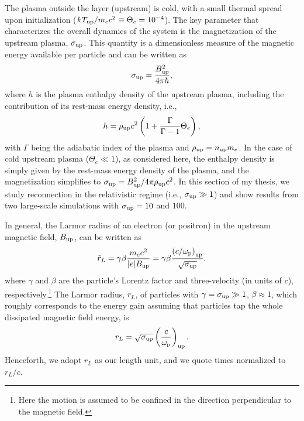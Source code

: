 The plasma outside the layer (upstream) is cold, with a small thermal spread upon initialization ($k T_{\rm up}/m_e c^2 \equiv \Theta_e =10^{-4}$). The key parameter that characterizes the overall dynamics of the system is the magnetization of the upstream plasma, $\sigma_{\rm up}$. This quantity is a dimensionless measure of the magnetic energy available per particle and can be written as
\begin{equation}
    \label{eq:sigmaups}
    \sigma_{\rm up} = \frac{B_{\rm up}^2}{4\pi h},
\end{equation}
where $h$ is the plasma enthalpy density of the upstream plasma, including the contribution of its rest-mass energy density, i.e., 
\begin{equation}
    \label{eq:enthalpy}
    h = \rho_{\rm up}c^2\left(1 + \frac{\Gamma}{\Gamma-1} \Theta_e\right),
\end{equation} 
with $\Gamma$ being the adiabatic index of the plasma and $\rho_{\rm up}=n_{\rm up} m_e$. In the case of cold upstream plasma ($\Theta_e \ll 1$), as considered here, the enthalpy density is simply given by the rest-mass energy  density of the plasma, and the magnetization simplifies to $\sigma_{\rm up} = B_{\rm up}^2/4\pi \rho_{\rm up} c^2$. In this section of my thesis, we study reconnection in the relativistic regime (i.e., $\sigma_{\rm up}\gg 1$) and show results from two large-scale simulations with $\sigma_{\rm up}=10$ and $100$.

In general, the Larmor radius of an electron (or positron) in the upstream magnetic field, $B_{\rm up}$, can be written as 
\begin{equation}
    \tilde{r}_{L} = \gamma\beta \frac{m_e c^2}{|e| B_{\rm up}} = 
    \gamma\beta\frac{\left(c/\omega_{\rm p}\right)_{\rm up}}{\sqrt{\sigma_{\rm up}}}.
\end{equation}
where $\gamma$ and $\beta$ are the particle's Lorentz factor and three-velocity (in units of $c$), respectively.\footnote{Here the motion is assumed to be confined in the direction perpendicular to the magnetic field.} The Larmor radius, $r_L$, of particles with $\gamma=\sigma_{\rm up}\gg 1$, $\beta\approx 1$, which roughly corresponds to the energy gain assuming that particles tap the whole dissipated magnetic field energy, is
 \begin{equation}
 \label{eq:rL}
    r_{L}=\sqrt{\sigma_{\rm up}}\left(\frac{c}{\omega_{\rm p}}\right)_{\rm up}.
\end{equation}
Henceforth, we adopt $r_{L}$ as our length unit, and we quote times normalized to $r_L/c$. 

